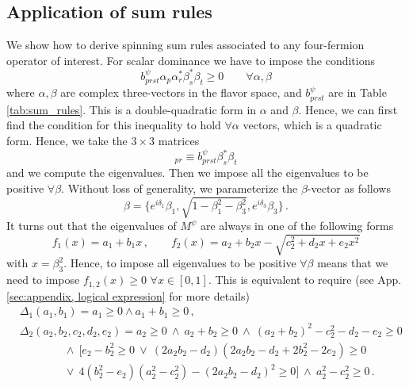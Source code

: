 \documentclass[a4paper,11pt]{article}
\begin{document}
\subsection{Application of sum rules}
We show how to derive spinning sum rules associated to any four-fermion operator of interest. For scalar dominance we have to impose the conditions
\begin{equation}
    b^\psi_{prst}\alpha_p \alpha_r^* \beta^*_s \beta_t\geq0\qquad \forall\alpha,\beta
\end{equation}
where $\alpha,\beta$ are complex three-vectors in the flavor space, and $b_{prst}^\psi$ are in Table \ref{tab:sum_rules}. This is a double-quadratic form in $\alpha$ and $\beta$. Hence, we can first find the condition for this inequality to hold $\forall\alpha$ vectors, which is a quadratic form. Hence, we take the $3\times 3$ matrices
\begin{equation}
    [M^\psi]_{pr}\equiv b^\psi_{prst}\beta^*_s \beta_t
\end{equation}
and we compute the eigenvalues. Then we impose all the eigenvalues to be positive $\forall\beta$. Without loss of generality, we parameterize the $\beta$-vector as follows
\begin{equation}
    \beta=\{e^{i\delta_1}\beta_1,\sqrt{1-\beta_1^2-\beta_3^2},e^{i\delta_3}\beta_3\}\,.
\end{equation}
It turns out that the eigenvalues of $M^\psi$ are always in one of the following forms
\begin{equation}
    f_1(x)=a_1+b_1x\,,\qquad f_2(x)=a_2 + b_2x - \sqrt{c_2^2 + d_2x + e_2x^2}
\end{equation}
with $x=\beta_3^2$. Hence, to impose all eigenvalues to be positive $\forall\beta$ means that we need to impose $f_{1,2}(x)\geq0$ $\forall x\in[0,1]$. This is equivalent to require (see App. \ref{sec:appendix, logical expression} for more details)
\begin{align}
    &\Delta_1(a_1,b_1)= a_1\geq0 \land a_1+b_1\geq 0\,,\\
    &\Delta_2(a_2,b_2,c_2,d_2,e_2) = 
    a_2 \ge 0 
    \ \land \
    a_2+b_2 \ge 0
    \ \land \ 
    (a_2+b_2)^2 - c_2^2 - d_2 - e_2 \ge 0 \nonumber
    \\& \qquad\qquad
    \land \
    \Big[e_2 - b_2^2 \ge 0 \ \lor\  (2a_2b_2-d_2)(2a_2b_2-d_2+2b_2^2-2e_2) \ge 0 \nonumber 
    \\& \qquad\qquad
    \lor \ 4(b_2^2-e_2)(a_2^2-c_2^2)-(2a_2b_2-d_2)^2 \ge 0\Big] \ \land \ 
    a_2^2 - c_2^2 \ge 0\,.
\end{align}
\end{document}
